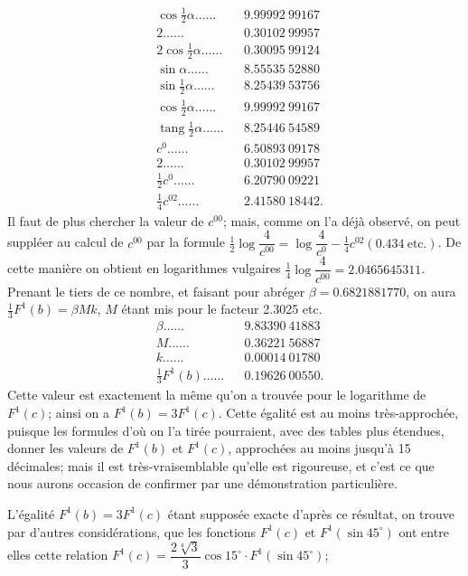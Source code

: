 \documentclass{article}
\begin{document}
\[ \begin{aligned} &\cos\tfrac{1}{2}\alpha\ldots\ldots && 9.99992\ 99167\\ &2\ldots\ldots && 0.30102\ 99957\\ &2\cos\tfrac{1}{2}\alpha\ldots\ldots && 0.30095\ 99124\\ &\sin\alpha\ldots\ldots && 8.55535\ 52880\\ &\sin\tfrac{1}{2}\alpha\ldots\ldots && 8.25439\ 53756\\ &\cos\tfrac{1}{2}\alpha\ldots\ldots && 9.99992\ 99167\\ &\operatorname{tang}\tfrac{1}{2}\alpha\ldots\ldots && 8.25446\ 54589\\ &c^{0}\ldots\ldots && 6.50893\ 09178\\ &2\ldots\ldots && 0.30102\ 99957\\ &\tfrac{1}{2}c^{0}\ldots\ldots && 6.20790\ 09221\\ &\tfrac{1}{4}c^{02}\ldots\ldots && 2.41580\ 18442. \end{aligned} \]
Il faut de plus chercher la valeur de $c^{00}$; mais, comme on l'a déjà observé, on peut suppléer au calcul de $c^{00}$ par la formule $\frac{1}{2}\log\dfrac{4}{c^{00}}=\log\dfrac{4}{c^{0}}-\frac{1}{4}c^{02}(0.434\ \text{etc.})$. De cette manière on obtient en logarithmes vulgaires $\frac{1}{4}\log\dfrac{4}{c^{00}}=2.0465645311$. Prenant le tiers de ce nombre, et faisant pour abréger $\beta=0.6821881770$, on aura $\frac{1}{3}F^{1}(b)=\beta Mk$, $M$ étant mis pour le facteur 2.3025 etc.
\[ \begin{aligned} &\beta\ldots\ldots && 9.83390\ 41883\\ &M\ldots\ldots && 0.36221\ 56887\\ &k\ldots\ldots && 0.00014\ 01780\\ &\tfrac{1}{3}F^{1}(b)\ldots\ldots && 0.19626\ 00550. \end{aligned} \]
Cette valeur est exactement la même qu'on a trouvée pour le logarithme de $F^{1}(c)$; ainsi on a $F^{1}(b)=3F^{1}(c)$. Cette égalité est au moins très-approchée, puisque les formules d'où on l'a tirée pourraient, avec des tables plus étendues, donner les valeurs de $F^{1}(b)$ et $F^{1}(c)$, approchées au moins jusqu'à 15 décimales; mais il est très-vraisemblable qu'elle est rigoureuse, et c'est ce que nous aurons occasion de confirmer par une démonstration particulière.

L'égalité $F^{1}(b)=3F^{1}(c)$ étant supposée exacte d'après ce résultat, on trouve par d'autres considérations, que les fonctions $F^{1}(c)$ et $F^{1}(\sin 45^{\circ})$ ont entre elles cette relation $F^{1}(c)=\dfrac{2\sqrt[4]{3}}{3}\cos 15^{\circ}\cdot F^{1}(\sin 45^{\circ})$;
\end{document}
